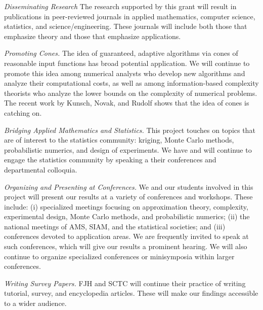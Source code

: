 \documentclass[11pt]{NSFamsart}
\begin{document}
\emph{Disseminating Research}
The research supported by this grant will result in publications in peer-reviewed journals in applied
mathematics, computer science, statistics, and science/engineering. These 
journals will include both those that emphasize theory and those that emphasize applications.

\emph{Promoting Cones.} The idea of guaranteed, adaptive algorithms via cones of reasonable input 
functions has broad potential application.  We will continue to promote this idea among numerical analysts 
who 
develop new algorithms and analyze their computational costs, as well as among information-based 
complexity theorists who analyze the lower bounds on the complexity of numerical problems.  The recent work by Kunsch, Novak, and Rudolf \cite{KunEtal19a} shows that the idea of cones is catching on.

\emph{Bridging Applied Mathematics and Statistics.}
This project touches on topics that are of interest to the statistics community: kriging, Monte Carlo methods, probabilistic numerics, and design of experiments.  We have and will continue to engage the statistics community 
by speaking a their conferences and departmental colloquia.

\emph{Organizing and Presenting at Conferences.}
We and our students involved in this project will present our results at a variety of conferences and workshops.  These include: (i) specialized meetings focusing on approximation theory, complexity, 
experimental design, Monte Carlo methods, and probabilistic numerics; (ii) the national meetings of AMS, SIAM, and the 
statistical societies; and (iii) conferences devoted to application areas.  We are frequently invited to 
speak at such conferences, which will give our results a prominent hearing. We will also continue to 
organize specialized conferences or minisymposia within larger conferences.

\emph{Writing Survey Papers.}
FJH and SCTC will continue their practice of writing tutorial, survey, and encyclopedia articles.  These will make our findings accessible to a wider audience.

\end{document}
